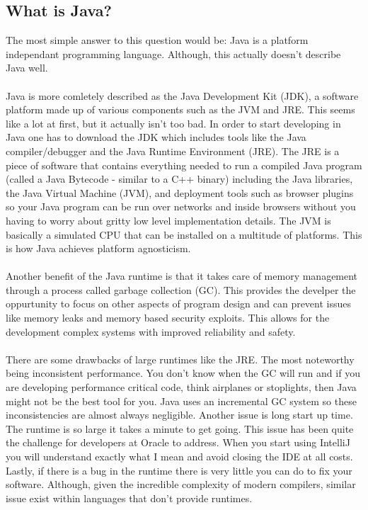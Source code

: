 \documentclass[../../main.tex]{subfiles}
\begin{document}
\subsection{What is Java?}
The most simple answer to this question would be: Java is a platform
independant programming language.
Although, this actually doesn't describe Java well.
\\\\
Java is more comletely described as the Java Development Kit (JDK),
a software platform made up of various components such as the JVM
and JRE.
This seems like a lot at first, but it actually isn't too bad. In order
to start developing in Java one has to download the JDK which includes
tools like the Java compiler/debugger and the Java Runtime Environment
(JRE). The JRE is a piece of software that contains everything needed
to run a compiled Java program (called a Java Bytecode - similar to a
C++ binary) including the Java libraries, the Java Virtual Machine
(JVM), and deployment tools such as browser plugins so your Java
program can be run over networks and inside browsers without you having
to worry about gritty low level implementation details. The JVM is
basically a simulated CPU that can be installed on a multitude of
platforms. This is how Java achieves platform agnosticism.
\\\\
Another benefit of the Java runtime is that it takes care of memory
management through a process called garbage collection (GC). This
provides the develper the oppurtunity to focus on other aspects of
program design and can prevent issues like memory leaks and memory
based security exploits. This allows for the development complex
systems with improved reliability and safety.
\\\\
There are some drawbacks of large runtimes like the JRE. The most
noteworthy being inconsistent performance.
You don't know when the GC will run and if you are developing
performance critical code, think airplanes or stoplights, then Java
might not be the best tool for you. Java uses an incremental GC
system so these inconsistencies are almost always negligible. Another
issue is long start up time. The runtime is so large it takes a minute 
to get going. This issue has been quite the challenge for developers at
Oracle to address. When you start using IntelliJ you will understand
exactly what I mean and avoid closing the IDE at all costs. Lastly, if 
there is a bug in the runtime there is very little you can do to fix
your software. Although, given the incredible complexity of modern
compilers, similar issue exist within languages that don't provide
runtimes.
\end{document}
